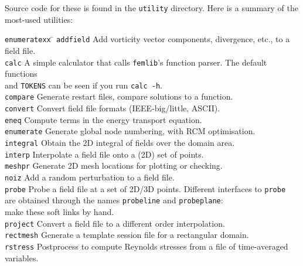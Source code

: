 \documentclass[11pt]{report}
\begin{document}
Source code for these is found in the \texttt{utility} directory.
Here is a summary of the most-used utilities:
\begin{tabbing}
\texttt{enumeratexx}  \= \kill
\texttt{addfield} \>   
        Add vorticity vector components, divergence, etc., to a field
	file.\\
\texttt{calc} \>      
        A simple calculator that calls \verb+femlib+'s function
        parser. The default functions\\\>and \texttt{TOKENS} can be seen
        if you run \texttt{calc -h}.\\
\texttt{compare} \>   
        Generate restart files, compare solutions to a function.\\
\texttt{convert} \>   
        Convert field file formats (IEEE-big/little, ASCII).\\
\texttt{eneq} \>   
        Compute terms in the energy transport equation.\\
\texttt{enumerate}  \>
        Generate global node numbering, with RCM optimisation.\\
\texttt{integral} \> Obtain the 2D integral of fields over the
        domain area.\\
\texttt{interp} \>   
        Interpolate a field file onto a (2D) set of points.\\
\texttt{meshpr} \>    
        Generate 2D mesh locations for plotting or checking.\\
\texttt{noiz} \>      
        Add a random perturbation to a field file.\\
\texttt{probe} \>   
        Probe a field file at a set of 2D/3D points. Different
        interfaces to \texttt{probe}\\ \> are obtained through the names
        \texttt{probeline} and \texttt{probeplane}: \\ \> make these soft
        links by hand.\\
\texttt{project} \>   
        Convert a field file to a different order interpolation.\\
\texttt{rectmesh} \>
        Generate a template session file for a rectangular domain.\\
\texttt{rstress} \>
	Postprocess to compute Reynolds stresses from a file of
        time-averaged variables.\\

\end{tabbing}
\end{document}
